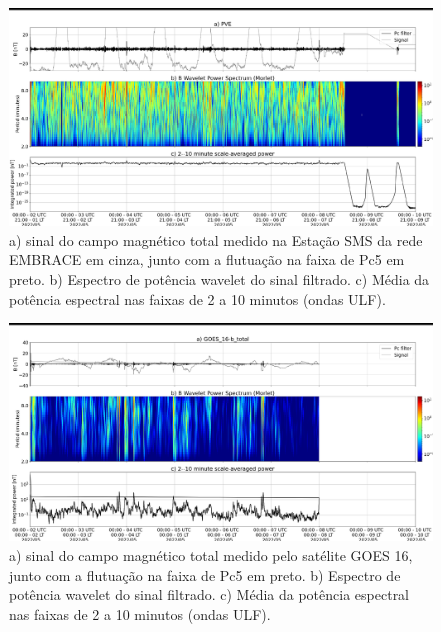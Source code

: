 \documentclass[a4paper, 10pt]{article}
\begin{document}
                        \begin{figure}[H]
    
                            \centering
   
                                \includegraphics[width=14cm]{./figures//figureULF_1.png}

                                \caption{a) sinal do campo magnético total medido 
                              na Estação SMS da rede EMBRACE em cinza, junto com a 
                              flutuação na faixa de Pc5 em preto. b) Espectro de potência 
                              wavelet do sinal filtrado. c) Média da potência espectral nas 
                              faixas de 2 a 10 minutos (ondas ULF).}
                            \end{figure}

                        \begin{figure}[H]
    
                            \centering
   
                                \includegraphics[width=14cm]{./figures//figureULF_2.png}

                                \caption{a) sinal do campo magnético total medido pelo 
                              satélite GOES 16, junto com a flutuação na faixa de Pc5 
                              em preto. b) Espectro de potência wavelet do sinal 
                              filtrado. c) Média da potência espectral nas faixas 
                              de 2 a 10 minutos (ondas ULF).}
                            \end{figure}
\end{document}
